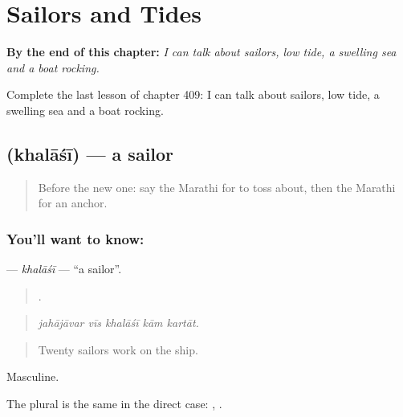 
\chapter{Sailors and Tides}
\label{ch:mr-sailors-and-tides}

\begin{chapteropening}
\textbf{By the end of this chapter:} \emph{I can talk about sailors, low tide, a swelling sea and a boat rocking.}

Complete the last lesson of chapter 409: I can talk about sailors, low tide, a swelling sea and a boat rocking.
\end{chapteropening}

\section[\texorpdfstring{\mr{खलाशी} (khalāśī)}{खलाशी (khalāśī)}]{ (khalāśī) — a sailor}

\label{lesson:MR-C409-khalasi}



\begin{quote}
Before the new one: say the Marathi for to toss about, then the Marathi for an anchor.
\end{quote}

\subsection*{You'll want to know: }
\textbf{} — \emph{khalāśī} — \textquotedblleft{}a sailor\textquotedblright{}.

\begin{quote}
    .
\end{quote}

\begin{quote}
\emph{jahājāvar vīs khalāśī kām kartāt.}
\end{quote}

\begin{quote}
Twenty sailors work on the ship.
\end{quote}

Masculine.

The plural is the same in the direct case:  ,  .

